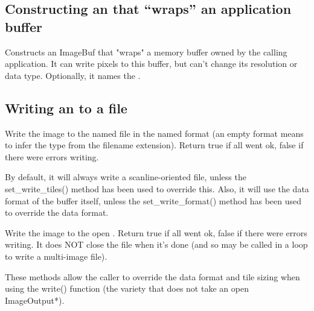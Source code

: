 \subsection*{Constructing an \ImageBuf that ``wraps'' an application buffer}

Constructs an ImageBuf that "wraps" a memory buffer owned by the calling
application.  It can write pixels to this buffer, but can't change its
resolution or data type.  Optionally, it names the \ImageBuf.
\apiend


\subsection*{Writing an \ImageBuf to a file}

Write the image to the named file in the named format
(an empty format means to infer the type from the filename
extension).  Return {\cf true} if all went ok, {\cf false} if there were
errors writing.

By default, it will always write a scanline-oriented file, unless the
{\cf set_write_tiles()} method has been used to override this.
Also, it will use the data format of the buffer itself, unless the
{\cf set_write_format()} method has been used to override the data format.
\apiend

Write the image to the open .  Return {\cf true}
if all went ok, {\cf false} if there were errors writing.  It does NOT
close the file when it's done (and so may be called in a loop to write a
multi-image file).
\apiend

These methods allow the caller to override the data format and tile
sizing when using the {\cf write()} function (the variety that does
not take an open {\cf ImageOutput*}).
\apiend


